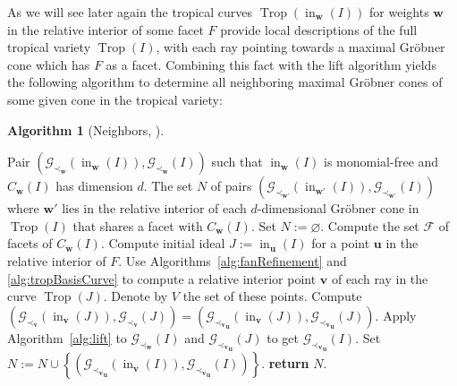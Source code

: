 \documentclass[
  paper=a4,
  titlepage,
  bibliography=totoc,
  pagesize=pdftex
]{scrartcl}
\numberwithin{figure}{section}
\numberwithin{equation}{section}
\numberwithin{table}{section}
\let\vec\mathbf
\DeclareMathOperator{\Trop}{Trop}
\DeclareMathOperator{\initial}{in}
\theoremstyle{definition}
\newtheorem{algo}[definition]{Algorithm}
\numberwithin{definition}{section}
\begin{document}
As we will see later again the tropical curves $\Trop(\initial_{\vec w}(I))$ for weights
$\vec w$ in the relative interior of some facet $F$ provide local descriptions of the full
tropical variety $\Trop(I)$, with each ray pointing towards a maximal Gröbner cone which
has $F$ as a facet. Combining this fact with the lift algorithm yields the following
algorithm to determine all neighboring maximal Gröbner cones of some given cone in the
tropical variety:

\begin{algo}[Neighbors, {\cite[Algorithm~4.10]{compTropVar}}]\
  \label{alg:neighbors}
  \begin{algorithmic}[1]
    \Require Pair $(\mathcal G_{\prec_{\vec w}}(\initial_{\vec w}(I)), \mathcal
      G_{\prec_{\vec w}}(I))$ such that $\initial_{\vec w}(I)$ is monomial-free and
      $C_{\vec w}(I)$ has dimension $d$.
    \Ensure The set $N$ of pairs $(\mathcal G_{\prec_{\vec w'}}(\initial_{\vec w'}(I)),
      \mathcal G_{\prec_{\vec w'}}(I))$ where $\vec w'$ lies in the relative interior of
      each $d$-dimensional Gröbner cone in $\Trop(I)$ that shares a facet with $C_{\vec
      w}(I)$.
    \State Set $N := \varnothing$.
    \State Compute the set $\mathcal F$ of facets of $C_{\vec w}(I)$.
    \For{$F \in \mathcal F$}
      \State Compute initial ideal $J := \initial_{\vec u}(I)$ for a point $\vec u$ in the
        relative interior of $F$.
        \label{alg:neigh:line:start}
      \State Use Algorithms~\ref{alg:fanRefinement} and \ref{alg:tropBasisCurve} to compute
        a relative interior point $\vec v$ of each ray in the curve $\Trop(J)$. Denote by
        $V$ the set of these points.
        \label{alg:interiorPoints}
      \For{$\vec v \in V$}
        \State Compute $(\mathcal G_{\prec_{\vec v}}(\initial_{\vec v}(J)), \mathcal
          G_{\prec_{\vec v}}(J)) = (\mathcal G_{{\prec_{\vec v}}_{\vec u}}(\initial_{\vec
          v}(J)), \mathcal G_{{\prec_{\vec v}}_{\vec u}}(J))$.
        \State Apply Algorithm~\ref{alg:lift} to $\mathcal G_{\prec_{\vec w}}(I)$ and
          $\mathcal G_{{\prec_{\vec v}}_{\vec u}}(J)$ to get $\mathcal G_{{\prec_{\vec
          v}}_{\vec u}}(I)$.
        \State Set $N := N \cup \left\{ (\mathcal G_{{\prec_{\vec v}}_{\vec
          u}}(\initial_{\vec v}(I)), \mathcal G_{{\prec_{\vec v}}_{\vec u}}(I))
          \right\}$.
      \EndFor\label{alg:neigh:line:end}
    \EndFor
    \State\textbf{return} $N$.
  \end{algorithmic}
\end{algo}
\end{document}
